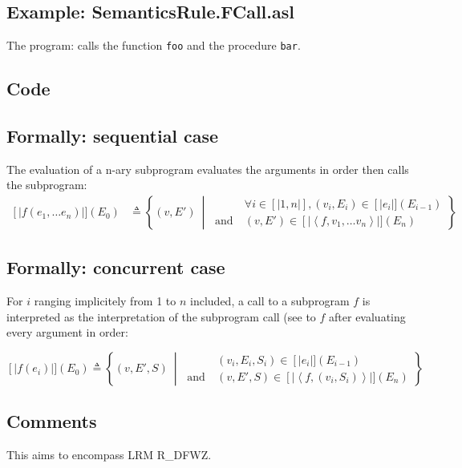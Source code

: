 \documentclass{book}
\newcommand\llbracket{[|}
\newcommand\rrbracket{|]}
\newcommand\interp[1]{\left\llbracket #1 \right\rrbracket}
\newcommand\st[0]{\ \middle|\ }
\begin{document}
  \subsection{Example: SemanticsRule.FCall.asl}
  The program:
  calls the function \texttt{foo} and the procedure \texttt{bar}.

  \subsection{Code}

  \subsection{Formally: sequential case}
  The evaluation of a n-ary subprogram evaluates the arguments in order then
  calls the subprogram:
  \begin{align}
  \interp{f (e_1, \dotsc e_n)} (E_0) & \triangleq
    \left\{ (v, E') \st{}
    \begin{aligned}
      & \forall i \in \llbracket 1, n \rrbracket, (v_i, E_i) \in \interp{e_i} (E_{i - 1})
      \\ \text{and}\ &
      (v, E') \in \interp{\left\langle f, v_1, \dotsc v_n \right\rangle} \left(E_n\right)
    \end{aligned}
    \right\}
  \label{eq:sem-seq-fcall}
  \end{align} 

  \subsection{Formally: concurrent case}
  For $i$ ranging implicitely from 1 to $n$ included, a call to a subprogram $f$
  is interpreted as the interpretation of the subprogram call (see to $f$ after
  evaluating every argument in order:

  \begin{equation}
    \interp{f (e_i)} (E_0) \triangleq
      \left\{ (v, E', S) \st{}
      \begin{aligned}
        & %
          (v_i, E_i, S_i) \in \interp{e_i} (E_{i - 1})
        \\ \text{and}\ &
        (v, E', S) \in \interp{\left\langle f, (v_i,S_i) \right\rangle} \left(E_n\right)
      \end{aligned}
      \right\}
    \label{eq:sem-conc-fcall}
  \end{equation}

  \subsection{Comments}
  This aims to encompass LRM R\_DFWZ.
\end{document}
